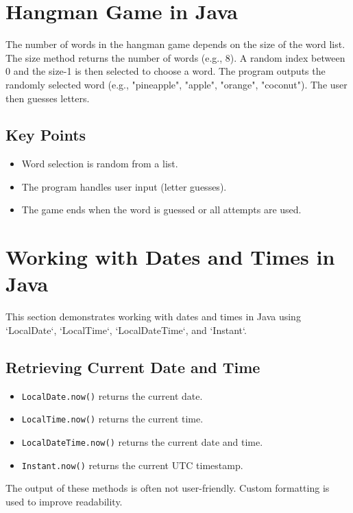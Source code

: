\documentclass{article}
\begin{document}
\begin{itemize}
\section{Hangman Game in Java}

The number of words in the hangman game depends on the size of the word list.  The size method returns the number of words (e.g., 8). A random index between 0 and the size-1 is then selected to choose a word. The program outputs the randomly selected word (e.g., "pineapple", "apple", "orange", "coconut").  The user then guesses letters.

\subsection{Key Points}

\begin{itemize}
    \item Word selection is random from a list.
    \item The program handles user input (letter guesses).
    \item The game ends when the word is guessed or all attempts are used.
\end{itemize}


\section{Working with Dates and Times in Java}

This section demonstrates working with dates and times in Java using `LocalDate`, `LocalTime`, `LocalDateTime`, and `Instant`.

\subsection{Retrieving Current Date and Time}

\begin{itemize}
    \item \texttt{LocalDate.now()} returns the current date.
    \item \texttt{LocalTime.now()} returns the current time.
    \item \texttt{LocalDateTime.now()} returns the current date and time.
    \item \texttt{Instant.now()} returns the current UTC timestamp.
\end{itemize}

The output of these methods is often not user-friendly.  Custom formatting is used to improve readability.



\end{itemize}
\end{document}
